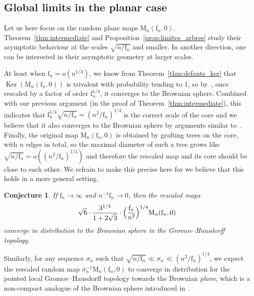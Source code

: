 \documentclass[JEP,XML,SOM,Unicode,NoFloatCountersInSection,NoEqCountersInSection]{cedram}
\theoremstyle{plain}
\newtheorem{conjecture}[theorem]{Conjecture}
\theoremstyle{definition}
\theoremstyle{remark}
\newcommand{\Map}{\mathrm{M}}
\newcommand{\face}{\mathrm{f}}
\DeclareMathOperator{\Ker}{Ker}
\begin{document}
\subsection{Global limits in the planar case}
\label{ssec:TBM}

Let us here focus on the random plane maps $\Map_n(\face_n, 0)$. Theorem~\ref{thm:intermediate} and Proposition~\ref{prop:limites_arbres} study their asymptotic behaviour at the scales $\sqrt{n/\face_n}$ and smaller.
In another direction, one can be interested in their asymptotic geometry at larger scales.

At least when $\face_n = o(n^{1/3})$, we know from Theorem~\ref{thm:defauts_ker} that $\Ker(\Map_n(\face_n, 0))$ is trivalent with probability tending to $1$, so by~\cite[Cor.\,23]{CLG19}, once rescaled by a factor of order $\face_n^{1/4}$, it converges to the Brownian sphere. Combined with our previous argument (\eg in the proof of Theorem~\ref{thm:intermediate}), this indicates that $\face_n^{1/4} \sqrt{n/ \face_n} = (n^2/\face_n)^{1/4}$ is the correct scale of the core and we believe that it also converges to the Brownian sphere by arguments similar to~\cite{CLG19}. Finally, the original map $\Map_n(\face_n, 0)$ is obtained by grafting trees on the core, with $n$ edges in total, so the maximal diameter of such a tree grows like
$
\sqrt{n/\face_n} = o((n^2/\face_n)^{1/4})$ and therefore the rescaled map and its core should be close to each other.
We refrain to make this precise here for we believe that this holds in a more general setting.

\begin{conjecture}\label{conjecture}
If $\face_n \to \infty$ and $n^{-1} \face_n \to 0$, then the rescaled maps
\[
\sqrt{6} \cdot \frac{3^{1/4}}{1+2\sqrt{3}} \cdot \Bigl(\frac{\face_n}{n^2}\Bigr)^{1/4} \Map_n(\face_n, 0)
\]
converge in distribution to the Brownian sphere in the Gromov--Hausdorff topology.
\end{conjecture}

Similarly, for any sequence $\sigma_n$ such that $\sqrt{n/\face_n} \ll \sigma_n \ll (n^2/\face_n)^{1/4}$, we expect the rescaled random map $\sigma_n^{-1} \Map_n(\face_{n},0)$ to converge in distribution for the pointed local Gromov--Hausdorff topology towards the Brownian \emph{plane}, which is a non-compact analogue of the Brownian sphere introduced in~\cite{CLG14}.
\end{document}
